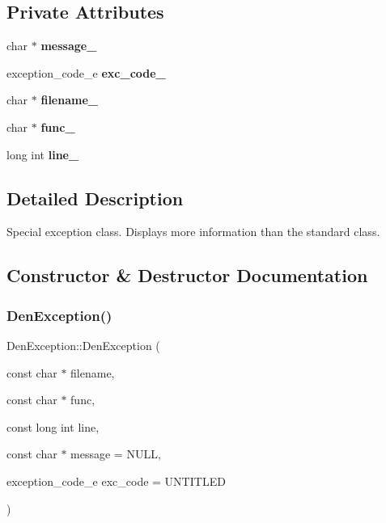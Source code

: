 \subsection*{Private Attributes}
\begin{DoxyCompactItemize}
\item 
\mbox{\label{classDenException_ac00d70d94b80bee04c3bd1001dcb9b59}} 
char $\ast$ {\bfseries message\+\_\+}
\item 
\mbox{\label{classDenException_a208f77c9eef3ca77c9856d53d61f6521}} 
exception\+\_\+code\+\_\+e {\bfseries exc\+\_\+code\+\_\+}
\item 
\mbox{\label{classDenException_af1a100cc67470e358b9f372cbc157830}} 
char $\ast$ {\bfseries filename\+\_\+}
\item 
\mbox{\label{classDenException_abbaa230a9b0fe68e0ef7eaad171f79a4}} 
char $\ast$ {\bfseries func\+\_\+}
\item 
\mbox{\label{classDenException_a5b7be04f7a34c9944e0d0e934e88ef26}} 
long int {\bfseries line\+\_\+}
\end{DoxyCompactItemize}


\subsection{Detailed Description}
Special exception class. Displays more information than the standard class. 

\subsection{Constructor \& Destructor Documentation}
\mbox{\label{classDenException_a126de088ce459641b0793bd754f4d171}} 
\subsubsection{\texorpdfstring{Den\+Exception()}{DenException()}\hspace{0.1cm}{\footnotesize\ttfamily [1/3]}}
{\footnotesize\ttfamily Den\+Exception\+::\+Den\+Exception (\begin{DoxyParamCaption}\item[{const char $\ast$}]{filename,  }\item[{const char $\ast$}]{func,  }\item[{const long int}]{line,  }\item[{const char $\ast$}]{message = {\ttfamily NULL},  }\item[{exception\+\_\+code\+\_\+e}]{exc\+\_\+code = {\ttfamily UNTITLED} }\end{DoxyParamCaption})}



